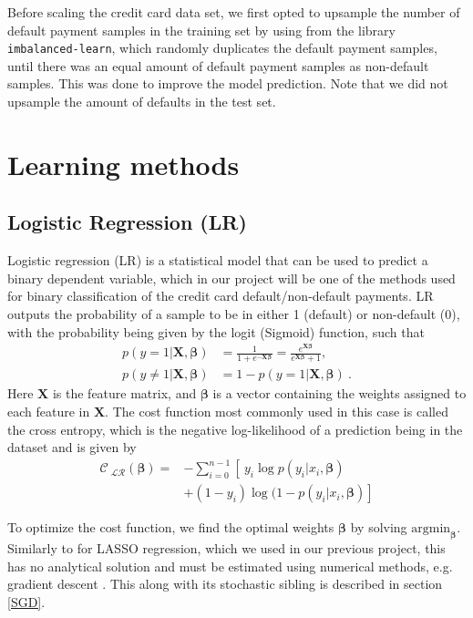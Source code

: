 \documentclass[a4paper, 11pt, twocolumn]{article}
\begin{document}
Before scaling the credit card data set, we first opted to upsample the number of
default payment samples in the training set by using
from the library \texttt{imbalanced-learn}, which randomly duplicates the default
payment samples, until there was an equal amount of default payment samples as
non-default samples. This was done to improve the model prediction. Note that we
did not upsample the amount of defaults in the test set.


\section{Learning methods}
\subsection{Logistic Regression (LR)}
Logistic regression (LR)  is a statistical model that can be used to predict a
binary dependent variable, which in our project will be one of the methods used
for binary classification of the credit card default/non-default payments. LR
outputs the probability of a sample to be in either 1 (default) or non-default (0),
with the probability being given by the logit (Sigmoid) function, such that
\begin{align}
p(y=1 | \bm{X}, \bm{\beta}) &= \frac{1}{1 + e^{-\bm{X} \bm{\beta}}} =
\frac{e^{\bm{X} \bm{\beta}}}{e^{\bm{X} \bm{\beta}}+1},\\
p(y\neq1 | \bm{X}, \bm{\beta}) &= 1 - p(y=1 | \bm{X}, \bm{\beta})\ .
\label{eq:LR_probability}
\end{align}
Here $\bm{X}$ is the feature matrix, and $\bm{\beta}$ is a vector containing the weights
assigned to each feature in $\bm{X}$.  The cost function most commonly used in this
case is called the cross entropy, which is the negative log-likelihood of a prediction
being in the dataset and is given by
\begin{align}
\mathcal{C_\text{ LR}}(\bm{\beta}) =& -\sum_{i=0}^{n-1} \left[\  y_i\log p(y_i|x_i, \bm{\beta}) \right. \nonumber\\
 &\left.+ (1-y_i)\log(1-p(y_i|x_i,\bm{\beta})    \right]
\end{align}


To optimize the cost function, we find the optimal weights $\bm{\beta}$ by
solving $\text{argmin}_{\bm{\beta}}$. Similarly to for LASSO regression, which
we used in our previous project, this has no analytical solution and must be
estimated using numerical methods, e.g. gradient descent \cite{regpaper}. This
along with its stochastic sibling is described in section \ref{SGD}.
\end{document}
